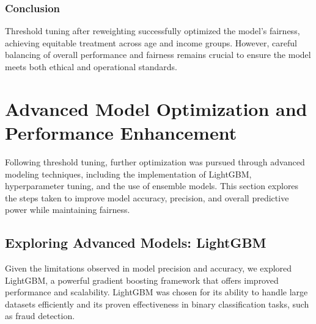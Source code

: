 \documentclass[12pt,a4paper]{report}
\begin{document}
\subsection{Conclusion}

Threshold tuning after reweighting successfully optimized the model’s fairness, achieving equitable treatment across age and income groups. However, careful balancing of overall performance and fairness remains crucial to ensure the model meets both ethical and operational standards.\\






\chapter{Advanced Model Optimization and Performance Enhancement}


Following threshold tuning, further optimization was pursued through advanced modeling techniques, including the implementation of LightGBM, hyperparameter tuning, and the use of ensemble models. This section explores the steps taken to improve model accuracy, precision, and overall predictive power while maintaining fairness.\\

\section{Exploring Advanced Models: LightGBM}

Given the limitations observed in model precision and accuracy, we explored LightGBM, a powerful gradient boosting framework that offers improved performance and scalability. LightGBM was chosen for its ability to handle large datasets efficiently and its proven effectiveness in binary classification tasks, such as fraud detection.\\
\end{document}
